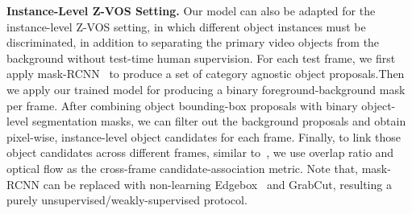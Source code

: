 \documentclass[10pt,twocolumn,letterpaper]{article}
\begin{document}
\noindent\textbf{Instance-Level Z-VOS Setting.} Our model can also be
adapted for the instance-level Z-VOS setting, in which different
object instances must be discriminated, in addition to separating the
primary video objects from the background without test-time human
supervision.  For each test frame, we first apply mask-RCNN~\!\cite{he2017mask} to produce a set of category agnostic object proposals.Then we apply our trained model for producing a binary foreground-background mask per frame.
After combining object bounding-box proposals with binary object-level segmentation masks,
we can filter out the background proposals and obtain pixel-wise, instance-level object candidates for each frame. Finally, to link those object candidates across different frames, similar to~\!\cite{luiten2018premvos}, we use overlap ratio and optical flow as the cross-frame candidate-association metric. Note that, mask-RCNN can be replaced with non-learning Edgebox~\cite{ZitnickECCV14edgeBoxes} and GrabCut, resulting a purely unsupervised/weakly-supervised protocol.
\end{document}

